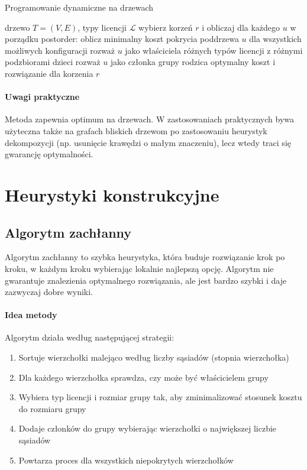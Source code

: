 \begin{algorithm}[H]
\caption{Programowanie dynamiczne na drzewach}
\label{alg:treedp}
\begin{algorithmic}[1]
\Require drzewo $T=(V,E)$, typy licencji $\mathcal{L}$
\State wybierz korzeń $r$ i obliczaj dla każdego $u$ w porządku postorder:
  \State oblicz minimalny koszt pokrycia poddrzewa $u$ dla wszystkich możliwych konfiguracji
  \State rozważ $u$ jako właściciela różnych typów licencji z różnymi podzbiorami dzieci
  \State rozważ $u$ jako członka grupy rodzica
\EndFor
\State \Return optymalny koszt i rozwiązanie dla korzenia $r$
\end{algorithmic}
\end{algorithm}

\paragraph{Uwagi praktyczne}
Metoda zapewnia optimum na drzewach. W zastosowaniach praktycznych bywa użyteczna także na grafach bliskich drzewom po zastosowaniu heurystyk dekompozycji (np. usunięcie krawędzi o małym znaczeniu), lecz wtedy traci się gwarancję optymalności.

\section{Heurystyki konstrukcyjne}

\subsection{Algorytm zachłanny}\label{subsec:greedy}

Algorytm zachłanny to szybka heurystyka, która buduje rozwiązanie krok po kroku, w każdym kroku wybierając lokalnie najlepszą opcję. Algorytm nie gwarantuje znalezienia optymalnego rozwiązania, ale jest bardzo szybki i daje zazwyczaj dobre wyniki.

\paragraph{Idea metody}
Algorytm działa według następującej strategii:
\begin{enumerate}
  \item Sortuje wierzchołki malejąco według liczby sąsiadów (stopnia wierzchołka)
  \item Dla każdego wierzchołka sprawdza, czy może być właścicielem grupy
  \item Wybiera typ licencji i rozmiar grupy tak, aby zminimalizować stosunek kosztu do rozmiaru grupy
  \item Dodaje członków do grupy wybierając wierzchołki o największej liczbie sąsiadów
  \item Powtarza proces dla wszystkich niepokrytych wierzchołków
\end{enumerate}


